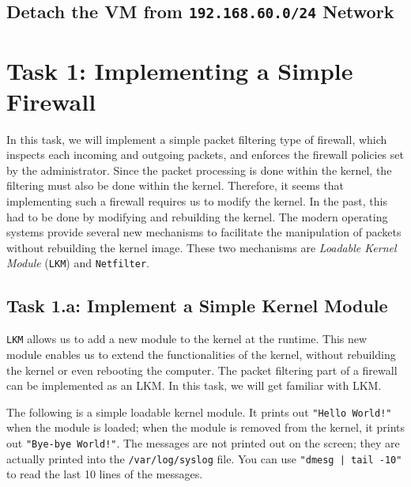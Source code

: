 \subsection{Detach the VM from \texttt{192.168.60.0/24} Network} 




\section{Task 1: Implementing a Simple Firewall} 


In this task, we will implement a simple packet filtering 
type of firewall, which 
inspects each incoming and outgoing packets, and enforces the firewall policies 
set by the administrator. Since the packet 
processing is done within the kernel, the filtering must also be 
done within the kernel. Therefore, it seems that implementing such
a firewall requires us to modify the \linux kernel. In the past, 
this had to be done by modifying and rebuilding 
the kernel. The modern \linux 
operating systems provide several new mechanisms 
to facilitate the manipulation of packets without rebuilding
the kernel image. These two mechanisms are 
\textit{Loadable Kernel Module} (\texttt{LKM}) and \texttt{Netfilter}.



\subsection{Task 1.a: Implement a Simple Kernel Module}


{\tt LKM} allows us to add a new module to the kernel at the runtime. 
This new module enables us to extend the functionalities of the kernel,
without rebuilding the kernel or even rebooting the computer. 
The packet filtering part of a firewall can be implemented as an LKM. 
In this task, we will get familiar with LKM.


The following is a simple loadable kernel module. It prints out 
\texttt{"Hello World!"} when the module is loaded; when the module
is removed from the kernel, it prints out \texttt{"Bye-bye World!"}.
The messages are not printed out on the screen; they are 
actually printed into the \texttt{/var/log/syslog} file. You can
use \texttt{"dmesg | tail -10"} to read the last 10 lines of 
the messages. 


